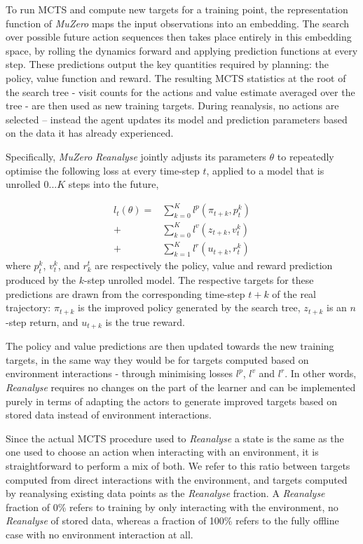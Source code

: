 \documentclass{article}
\newcommand{\muzero}{\emph{MuZero}}
\newcommand{\reanalyse}{\emph{Reanalyse}}
\begin{document}
To run MCTS and compute new targets for a training point, the representation function of \muzero{} maps the input observations into an embedding. The search over possible future action sequences then takes place entirely in this embedding space, by rolling the dynamics forward and applying prediction functions at every step. These predictions output the key quantities required by planning: the policy, value function and reward. The resulting MCTS statistics at the root of the search tree - visit counts for the actions and value estimate averaged over the tree - are then used as new training targets. During reanalysis, no actions are selected -- instead the agent updates its model and prediction parameters based on the data it has already experienced.

Specifically, \muzero{} \reanalyse{} jointly adjusts its parameters $\theta$ to repeatedly optimise the following loss at every time-step $t$, applied to a model that is unrolled $0...K$ steps into the future,

\begin{equation}
\begin{aligned}
l_t(\theta) = & \sum_{k=0}^K l^p(\pi_{t+k}, p^k_t)\\
            + & \sum_{k=0}^K l^v(z_{t+k}, v^k_t)\\
            + & \sum_{k=1}^K l^r (u_{t+k}, r_t^k)
\end{aligned}
\end{equation}
where $p^k_t$, $v^k_t$, and $r^t_k$ are respectively the policy, value and reward prediction produced by the $k$-step unrolled model. The respective targets for these predictions are drawn from the corresponding time-step $t+k$ of the real trajectory: $\pi_{t+k}$ is the improved policy generated by the search tree, $z_{t+k}$ is an $n$-step return, and $u_{t+k}$ is the true reward.

The policy and value predictions are then updated towards the new training targets, in the same way they would be for targets computed based on environment interactions - through minimising losses $l^p$, $l^v$ and $l^r$. In other words, \reanalyse{} requires no changes on the part of the learner and can be implemented purely in terms of adapting the actors to generate improved targets based on stored data instead of environment interactions.


Since the actual MCTS procedure used to \reanalyse{} a state is the same as the one used to choose an action when interacting with an environment, it is straightforward to perform a mix of both. We refer to this ratio between targets computed from direct interactions with the environment, and targets computed by reanalysing existing data points as the \reanalyse{} fraction. A \reanalyse{} fraction of 0\% refers to training by only interacting with the environment, no \reanalyse{} of stored data, whereas a fraction of 100\% refers to the fully offline case with no environment interaction at all.
\end{document}

